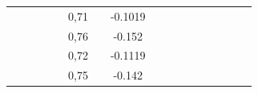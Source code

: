 \documentclass[a4paper,12pt]{article}
\begin{document}
\begin{landscape}
\begin{table}[]
\begin{tabular}{|c|c|c|c|c|c|c|c|c|c|c|c|c|c|c|c|c|}
                     &                           &                         &                         &                        & 0,71 &                         & -0.1019 &                          &                          &                          &                           &                        &                           &                           &                         &                           \\ \cline{6-6} \cline{8-8}
                     &                           &                         &                         &                        & 0,76 &                         & -0.152  &                          &                          &                          &                           &                        &                           &                           &                         &                           \\ \cline{6-6} \cline{8-8}
                     &                           &                         &                         &                        & 0,72 &                         & -0.1119 &                          &                          &                          &                           &                        &                           &                           &                         &                           \\ \cline{6-6} \cline{8-8}
                     &                           &                         &                         &                        & 0,75 &                         & -0.142  &                          &                          &                          &                           &                        &                           &                           &                         &                           \\ \hline
\end{tabular}
\end{table}

\end{landscape}
\newpage
\end{document}
